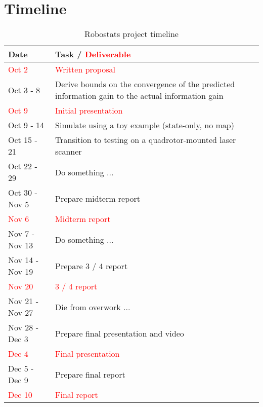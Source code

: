 \section{Timeline}

\begin{table}[!ht]
  \centering
  \begin{tabular}{|l|p{13.5 cm} | } \hline
    \textbf{Date} & \textbf{Task / \textcolor{red}{Deliverable}} \\ \hline
            \textcolor{red}{Oct 2} & \textcolor{red}{Written proposal} \\ \hline
            Oct 3 - 8 & Derive bounds on the convergence of the predicted information gain to the actual information gain \\ \hline
            \textcolor{red}{Oct 9} & \textcolor{red}{Initial presentation} \\ \hline
            Oct 9 - 14 & Simulate using a toy example (state-only, no map) \\ \hline
            Oct 15 - 21 & Transition to testing on a quadrotor-mounted laser scanner \\ \hline
            Oct 22 - 29 & Do something ... \\ \hline
            Oct 30 - Nov 5 & Prepare midterm report \\ \hline
            \textcolor{red}{Nov 6} & \textcolor{red}{Midterm report} \\ \hline
            Nov 7 - Nov 13 & Do something ... \\ \hline
            Nov 14 - Nov 19 & Prepare 3 / 4 report \\ \hline
           \textcolor{red}{Nov 20} & \textcolor{red}{3 / 4 report} \\ \hline
             Nov 21 - Nov 27 & Die from overwork ... \\ \hline
            Nov 28 - Dec 3 & Prepare final presentation and video \\ \hline
            \textcolor{red}{Dec 4} & \textcolor{red}{Final presentation} \\ \hline
            Dec 5 - Dec 9 & Prepare final report \\ \hline
           \textcolor{red}{Dec 10} & \textcolor{red}{Final report} \\ \hline
  \end{tabular}
  \caption{Robostats project timeline}
  \label{tab:timeline}
\end{table}

